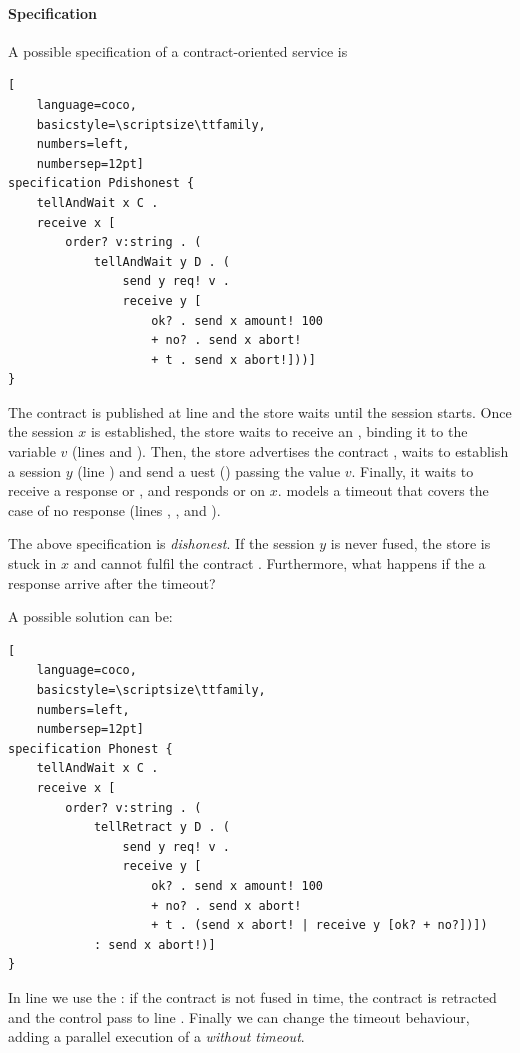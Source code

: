 \paragraph{Specification}
A possible specification of a contract-oriented service is
\begin{lstlisting}[
    language=coco,
    basicstyle=\scriptsize\ttfamily,
    numbers=left,
    numbersep=12pt]
specification Pdishonest {
    tellAndWait x C .
    receive x [
        order? v:string . (
            tellAndWait y D . (
                send y req! v .
                receive y [
                    ok? . send x amount! 100
                    + no? . send x abort!
                    + t . send x abort!]))]
}
\end{lstlisting}

The contract  is published at line  and the store waits
until the session starts.
Once the session $x$ is established, the store waits
to receive an , 
binding it to the variable $v$ (lines  and ).
Then, the store advertises the contract , waits to establish a session
$y$ (line ) and send a uest () passing 
the value $v$.
Finally, it waits to receive a response  or ,
and responds  or  on $x$. 
 models a timeout that covers the case of no response (lines ,
,  and ).

The above specification is \emph{dishonest}. If the session $y$
is never fused, the store is stuck in $x$ and cannot fulfil the contract .
Furthermore, what happens if the a response arrive after the timeout?

A possible solution can be:
\begin{lstlisting}[
    language=coco,
    basicstyle=\scriptsize\ttfamily,
    numbers=left,
    numbersep=12pt]
specification Phonest {
    tellAndWait x C .
    receive x [
        order? v:string . (
            tellRetract y D . (
                send y req! v .
                receive y [
                    ok? . send x amount! 100
                    + no? . send x abort!
                    + t . (send x abort! | receive y [ok? + no?])]) 
            : send x abort!)]
}
\end{lstlisting}
In line  we use the : if the contract 
is not fused in time, the contract is retracted and the control pass to line .
Finally we can change the timeout  behaviour, adding a parallel
execution of a  \emph{without timeout}.

